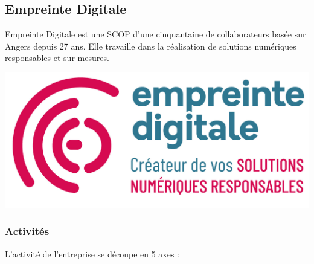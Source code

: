 \documentclass[12pt]{article}
\begin{document}
\subsection{Empreinte Digitale}
\noindent%
\begin{minipage}{.7\textwidth}%
Empreinte Digitale est une \gls{SCOP} d'une cinquantaine de collaborateurs basée sur Angers depuis 27 ans. 
Elle travaille dans la réalisation de solutions numériques responsables et sur mesures.
\end{minipage}%
\hfill
\begin{minipage}{.3\textwidth}%
\begin{center}
    \includegraphics[scale=0.3]{src/logo_ed.png}
\end{center}
\end{minipage}%

\subsubsection{Activités}
L'activité de l'entreprise se découpe en 5 axes :
\end{document}

